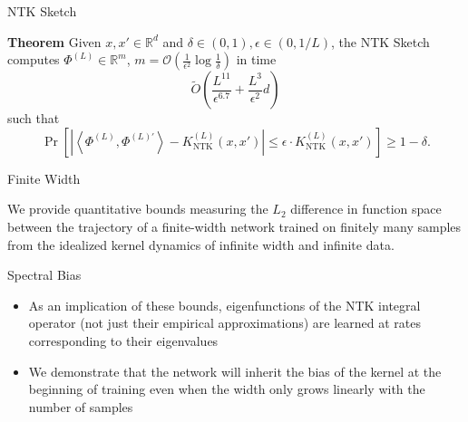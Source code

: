 \documentclass[serif, aspectratio=169]{beamer}
\begin{document}
\begin{frame}{NTK Sketch}
	
	\textbf{Theorem} Given \( x, x' \in \mathbb{R}^d \) and \( \delta \in (0, 1), \epsilon \in (0, 1/L) \), the NTK Sketch computes \( \Phi^{(L)} \in \mathbb{R}^m \), \( m = \mathcal{O}\left(\frac{1}{\epsilon^2} \log \frac{1}{\delta}\right) \) in time
	\[
	\tilde{O}\left( \frac{L^{11}}{\epsilon^{6.7}} + \frac{L^3}{\epsilon^2} d \right)
	\]
	such that
	\[
	\Pr\left[ \left| \left\langle \Phi^{(L)}, \Phi^{(L)'} \right\rangle - K_{\text{NTK}}^{(L)}(x, x') \right| \leq \epsilon \cdot K_{\text{NTK}}^{(L)}(x, x') \right] \geq 1 - \delta.
	\]

\end{frame}



\begin{frame}{Finite Width}
	
We provide quantitative bounds measuring the \(L_
2\) difference in function space between the trajectory of a finite-width network trained on finitely many samples from the idealized kernel dynamics
of infinite width and infinite data.
	
\end{frame}


\begin{frame}{Spectral Bias}
	\begin{itemize}

	\item As an implication of these bounds, eigenfunctions of the NTK integral operator (not just their empirical approximations) are learned at rates corresponding to their eigenvalues
	 
	\item We demonstrate that the network will inherit the bias of the kernel at the beginning of training
	even when the width only grows linearly with the number of samples
	
	\end{itemize}
\end{frame}
\end{document}
